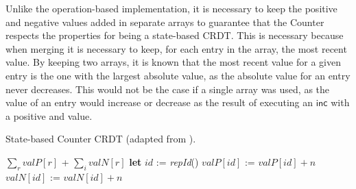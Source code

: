 \documentclass[12pt]{article}
\newcommand{\Let}{\textbf{let} }
\begin{document}
Unlike the operation-based implementation, it is necessary to keep the positive 
and negative values added in separate arrays to guarantee that the Counter respects the
properties for being a state-based CRDT.
This is necessary because when merging it is necessary to keep, for each entry
in the array, the most recent value. 
By keeping two arrays, it is known that the most recent value for a given entry is
the one with the largest absolute value, as the absolute value for an entry never 
decreases.
This would not be the case if a single array was used, as the value of an entry would
increase or decrease as the result of executing an $\textsf{inc}$ with a positive and 
value.

\begin{algorithm}
\caption{State-based Counter CRDT (adapted from \cite{Shapiro11Comprehensive}).}
\label{alg:st:counter}
\begin{algorithmic}[1]
 
\EndPayload
{}
\State \Return $\sum_r \mathit{valP}[r]$ + $\sum_i \mathit{valN}[r]$
\EndQuery
{}
    \State \Let $\mathit{id}$ := \emph{repId}() 
    \State $\mathit{valP}[\mathit{id}]$ := $\mathit{valP}[\mathit{id}] + n$
    \Else
    \State $\mathit{valN}[\mathit{id}]$ := $\mathit{valN}[\mathit{id}] + n$
    \EndIf
\EndUpdate
{}
    \EndFor
\EndMerge
\end{algorithmic}
\end{algorithm}

\end{document}

